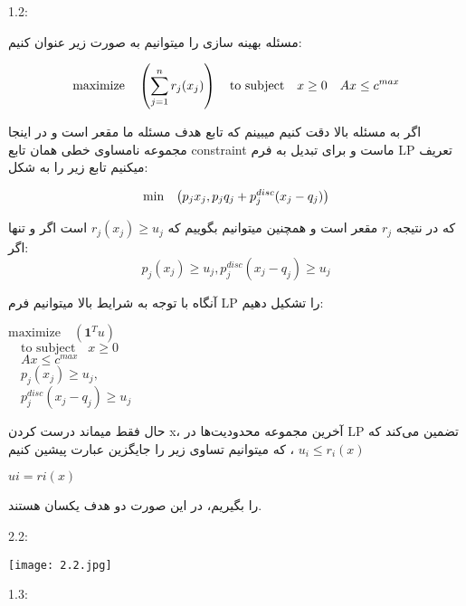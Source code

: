 1.2:

مسئله بهینه سازی را میتوانیم به صورت زیر عنوان کنیم:

\begin{equation}
\text{maximize}\quad \left(\sum_{j=1}^{n}r_j(x_j)\right)\\
\quad \text{to subject} \quad x \geq 0
\quad Ax \leq c^{max}
\end{equation}

اگر به مسئله بالا دقت کنیم میبینم که تابع هدف مسئله ما مقعر است و در اینجا مجموعه نامساوی خطی همان تابع constraint ماست و برای تبدیل به فرم LP تعریف میکنیم تابع زیر را به شکل:

\begin{equation}
\text{min}\quad {\left(p_jx_j,p_jq_j+p^{disc}_j(x_j-q_j)\right)}\\
\end{equation}


که در نتیجه $ r_j $ مقعر است و همچنین میتوانیم بگوییم که 
$ r_j(x_j) \geq u_j $
است اگر و تنها اگر:
\begin{equation}
 p_j(x_j) \geq u_j ,
p^{disc}_j(x_j-q_j) \geq u_j 
\end{equation}

آنگاه با توجه به شرایط بالا میتوانیم فرم LP را تشکیل دهیم:

\begin{center}
$ \text{maximize}\quad \left(\mathbf{1}^Tu\right) $\\
$ \quad \text{to subject} \quad x \geq 0 $\\
$ \quad Ax \leq c^{max}$\\
$\quad p_j(x_j) \geq u_j ,$\\ 
$\quad p^{disc}_j(x_j-q_j) \geq u_j$\\
\end{center}

حال فقط میماند درست کردن x، آخرین مجموعه محدودیت‌ها در LP تضمین می‌کند که 
$ u_i \leq r_i(x) $ ،
که میتوانیم تساوی زیر را جایگزین عبارت پیشین کنیم
\begin{center}
$ ui = ri(x) $
\end{center}
 را بگیریم، در این صورت دو هدف یکسان هستند.


2.2:


\begin{center}
    \texttt{[image: 2.2.jpg]}
\end{center}


1.3:

